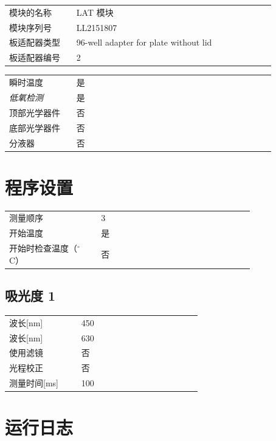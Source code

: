\documentclass[UTF8,10pt,a4paper,fontset=fandol]{ctexart}
\begin{document}
\begin{tabular}{@{}p{0.22\linewidth}p{0.65\linewidth}@{}}
模块的名称 & LAT 模块\\
模块序列号 & LL2151807\\
板适配器类型 & 96-well adapter for plate without lid\\
板适配器编号 & 2\\
\end{tabular}

\begin{tabular}{@{}p{0.22\linewidth}p{0.65\linewidth}@{}}
瞬时温度 & 是\\
\textit{低氧检测} & 是\\
顶部光学器件 & 否\\
底部光学器件 & 否\\
分液器 & 否\\
\end{tabular}

\section*{程序设置}

\begin{tabular}{@{}p{0.30\linewidth}p{0.50\linewidth}@{}}
测量顺序 & 3\\
开始温度 & 是\\
开始时检查温度（$^\circ$C） & 否\\
\end{tabular}

\subsection*{吸光度 1}

\begin{tabular}{@{}p{0.30\linewidth}p{0.50\linewidth}@{}}
波长[nm] & 450\\
波长[nm] & 630\\
使用滤镜 & 否\\
光程校正 & 否\\
测量时间[ms] & 100\\
\end{tabular}

\section*{运行日志}
\end{document}
